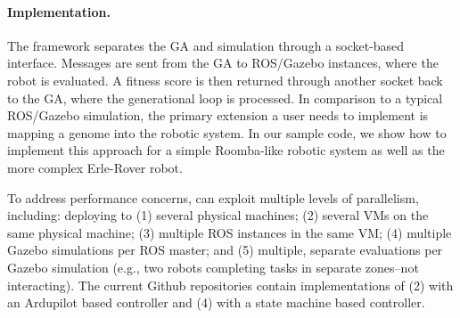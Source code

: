 \paragraph{Implementation.}
The {\project} framework separates the GA and simulation through a socket-based interface.  
%
Messages are sent from the GA to ROS/Gazebo instances, where the robot is evaluated.  
%
A fitness score is then returned through another socket back to the GA, where the generational loop is processed.  
%
In comparison to a typical ROS/Gazebo simulation, the primary extension a user needs to implement is mapping a genome into the robotic system.  
%
In our sample code, we show how to implement this approach for a simple Roomba-like robotic system as well as the more complex Erle-Rover robot.  

To address performance concerns, {\project} can exploit multiple levels of parallelism, including: 
deploying to (1) several physical machines; (2) several VMs on the same physical machine; (3) multiple ROS instances in the same VM; (4) multiple Gazebo simulations per ROS master; and (5) multiple, separate evaluations per Gazebo simulation (e.g., two robots completing tasks in separate zones--not interacting).  
%
The current Github repositories contain implementations of (2) with an Ardupilot based controller and (4) with a state machine based controller.
